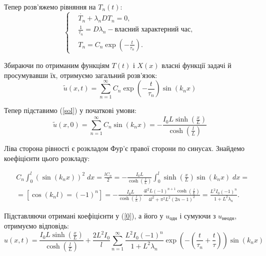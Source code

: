 Тепер розв'яжемо рівняння на $T_n(t)$:
\begin{equation} 
    \left\{ \begin{aligned}
        &\dot{T_n}+\lambda_n DT_n=0,\\
        &\frac1{\tau_n} = D\lambda_n - \text{власний характерний час},\\
        &T_n=C_n\exp{\left(-\frac t{\tau_n}\right)}.
    \end{aligned} \right.
\end{equation}

Збираючи по отриманим функціям $T(t)$ і $X(x)$ власні функції задачі й просумувавши їх, отримуємо загальний розв'язок:
\begin{equation} \label{sol}
    \tilde{u}(x,t)=\sum_{n=1}^{\infty} C_n\exp{\left(-\frac t{\tau_n}\right)}\sin\left(k_n x\right)
\end{equation}

Тепер підставимо (\ref{sol}) у початкові умови:
\begin{equation} \label{0}
    \tilde{u}(x,0)=\sum_{n=1}^{\infty} C_n\sin\left(k_n x\right)=-\frac{I_0L\sinh{(\frac{x}{L})}}{\cosh{(\frac{l}{L})}}
\end{equation}

Ліва сторона рівності є розкладом Фур'є правої сторони по синусах. Знайдемо коефіцієнти цього розкладу:

\begin{equation*}
    \begin{aligned} 
        &C_n\int_{0}^{l} \left( \sin\left(k_n x\right)\right)^2\;dx= \frac{lC_n}{2}
        =-\frac{I_0L}{\cosh{(\frac{l}{L})}}\int_{0}^{l}\sinh{\left(\frac{x}{L}\right)}\sin\left(k_n x\right)\;dx=\\
        &=\left[\cos(k_n l)=(-1)^n\right]=-\frac{I_0L}{\cosh{(\frac{l}{L})}}\frac{4l^2L(-1)^{n+1}\cosh{(\frac{l}{L})}}{4l^2+\pi^2L^2(2n-1)^2}=\frac{L^2I_0(-1)^n}{1+L^2\lambda_n}.
    \end{aligned}
\end{equation*}

Підставляючи отримані коефіцієнти у (\ref{0}), а його у $u_{\text{одн}}$ і сумуючи з $u_{\text{неодн}}$, отримуємо відповідь:
\begin{equation*} 
        u(x,t)=\frac{I_0L\sinh{(\frac{x}{L})}}{\cosh{(\frac{l}{L})}}+\frac{2L^2I_0}{l}\sum_{n=1}^{\infty}\frac{L^2I_0(-1)^n}{1+L^2\lambda_n}\exp{\left(-\left(\frac t{\tau_n}+\frac{t}{\tau}\right) \right)}\sin\left(k_n x\right)
\end{equation*}

%